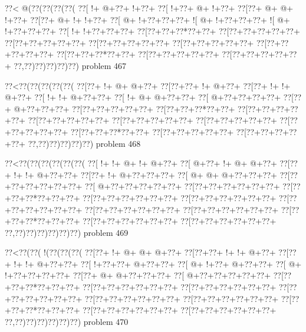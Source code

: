 \vbox{\vbox{\goo
\0??<\- @(\0??(\0??(\0??(\0??(
\0??[\- !+\- @+\0??+\- !+\0??+
\0??[\- !+\0??+\- @+\- !+\0??+
\0??[\0??+\- @+\- @+\- !+\0??+
\0??[\0??+\- @+\- !+\- !+\0??+
\0??[\- @+\- !+\0??+\0??+\0??+
\- ![\- @+\- !+\0??+\0??+\0??+
\- ![\- @+\- !+\0??+\0??+\0??+
\0??[\- !+\- !+\0??+\0??+\0??+
\0??[\0??+\0??+\0??*\0??+\0??+
\0??[\0??+\0??+\0??+\0??+\0??+
\0??[\0??+\0??+\0??+\0??+\0??+
\0??[\0??+\0??+\0??+\0??+\0??+
\0??[\0??+\0??+\0??+\0??+\0??+
\0??[\0??+\0??+\0??+\0??+\0??+
\0??[\0??+\0??+\0??*\0??+\0??+
\0??[\0??+\0??+\0??+\0??+\0??+
\0??[\0??+\0??+\0??+\0??+\0??+
\0??,\0??)\0??)\0??)\0??)\0??)
}
\hfil problem 467\hfil\break
}

\vbox{\vbox{\goo
\0??<\0??(\0??(\0??(\0??(\0??(
\0??[\0??+\- !+\- @+\- @+\0??+
\0??[\0??+\0??+\- !+\- @+\0??+
\0??[\0??+\- !+\- !+\- @+\0??+
\0??[\- !+\- !+\- @+\0??+\0??+
\0??[\- !+\- @+\- @+\0??+\0??+
\0??[\- @+\0??+\0??+\0??+\0??+
\0??[\0??+\- @+\0??+\0??+\0??+
\0??[\0??+\0??+\0??+\0??+\0??+
\0??[\0??+\0??+\0??*\0??+\0??+
\0??[\0??+\0??+\0??+\0??+\0??+
\0??[\0??+\0??+\0??+\0??+\0??+
\0??[\0??+\0??+\0??+\0??+\0??+
\0??[\0??+\0??+\0??+\0??+\0??+
\0??[\0??+\0??+\0??+\0??+\0??+
\0??[\0??+\0??+\0??*\0??+\0??+
\0??[\0??+\0??+\0??+\0??+\0??+
\0??[\0??+\0??+\0??+\0??+\0??+
\0??,\0??)\0??)\0??)\0??)\0??)
}
\hfil problem 468\hfil\break
}

\vbox{\vbox{\goo
\0??<\0??(\0??(\0??(\0??(\0??(\0??(
\0??[\- !+\- !+\- @+\- !+\- @+\0??+
\0??[\- @+\0??+\- !+\- @+\- @+\0??+
\0??[\0??+\- !+\- !+\- @+\0??+\0??+
\0??[\0??+\- !+\- @+\0??+\0??+\0??+
\0??[\- @+\- @+\- @+\0??+\0??+\0??+
\0??[\0??+\0??+\0??+\0??+\0??+\0??+
\0??[\- @+\0??+\0??+\0??+\0??+\0??+
\0??[\0??+\0??+\0??+\0??+\0??+\0??+
\0??[\0??+\0??+\0??*\0??+\0??+\0??+
\0??[\0??+\0??+\0??+\0??+\0??+\0??+
\0??[\0??+\0??+\0??+\0??+\0??+\0??+
\0??[\0??+\0??+\0??+\0??+\0??+\0??+
\0??[\0??+\0??+\0??+\0??+\0??+\0??+
\0??[\0??+\0??+\0??+\0??+\0??+\0??+
\0??[\0??+\0??+\0??*\0??+\0??+\0??+
\0??[\0??+\0??+\0??+\0??+\0??+\0??+
\0??[\0??+\0??+\0??+\0??+\0??+\0??+
\0??,\0??)\0??)\0??)\0??)\0??)\0??)
}
\hfil problem 469\hfil\break
}

\vbox{\vbox{\goo
\0??<\0??(\0??(\- !(\0??(\0??(\0??(
\0??[\0??+\- !+\- @+\- @+\- @+\0??+
\0??[\0??+\0??+\- !+\- !+\- @+\0??+
\0??[\0??+\- !+\- !+\- @+\0??+\0??+
\0??[\- !+\0??+\0??+\- @+\0??+\0??+
\0??[\- @+\- !+\0??+\- @+\0??+\0??+
\0??[\- @+\- !+\0??+\0??+\0??+\0??+
\0??[\0??+\- @+\- @+\0??+\0??+\0??+
\0??[\- @+\0??+\0??+\0??+\0??+\0??+
\0??[\0??+\0??+\0??*\0??+\0??+\0??+
\0??[\0??+\0??+\0??+\0??+\0??+\0??+
\0??[\0??+\0??+\0??+\0??+\0??+\0??+
\0??[\0??+\0??+\0??+\0??+\0??+\0??+
\0??[\0??+\0??+\0??+\0??+\0??+\0??+
\0??[\0??+\0??+\0??+\0??+\0??+\0??+
\0??[\0??+\0??+\0??*\0??+\0??+\0??+
\0??[\0??+\0??+\0??+\0??+\0??+\0??+
\0??[\0??+\0??+\0??+\0??+\0??+\0??+
\0??,\0??)\0??)\0??)\0??)\0??)\0??)
}
\hfil problem 470\hfil\break
}

